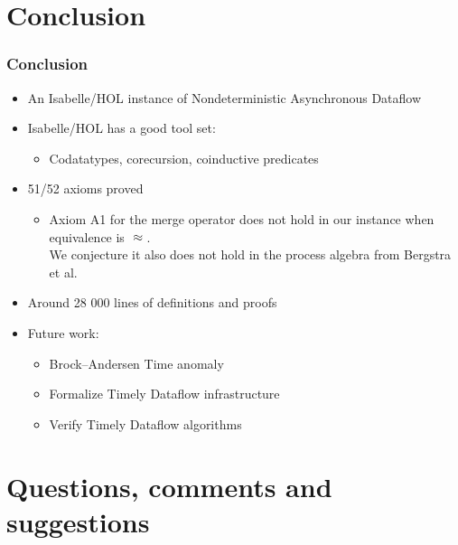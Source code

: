 \documentclass[fleqn,aspectratio=169,10pt]{beamer}
\begin{document}
\section{Conclusion}
\begin{frame}
  \frametitle{Conclusion}
  \begin{itemize}
    \item An Isabelle/HOL instance of Nondeterministic Asynchronous Dataflow
          \pause
    \item Isabelle/HOL has a good tool set:
          \begin{itemize}
            \item Codatatypes, corecursion, coinductive predicates
          \end{itemize}
          \pause
    \item 51/52 axioms proved
          \begin{itemize}
            \item Axiom A1 for the merge operator does not hold in our instance when equivalence is ${} \approx {}$. \\
                  We conjecture it also does not hold in the process algebra from Bergstra et al.
          \end{itemize}
          \pause
          \pause
    \item Around 28 000 lines of definitions and proofs
          \pause
    \item Future work:
          \begin{itemize}
            \item Brock–Andersen Time anomaly
            \item Formalize Timely Dataflow infrastructure
            \item Verify Timely Dataflow algorithms
          \end{itemize}
  \end{itemize}
\end{frame}

\section{Questions, comments and suggestions}
\end{document}
